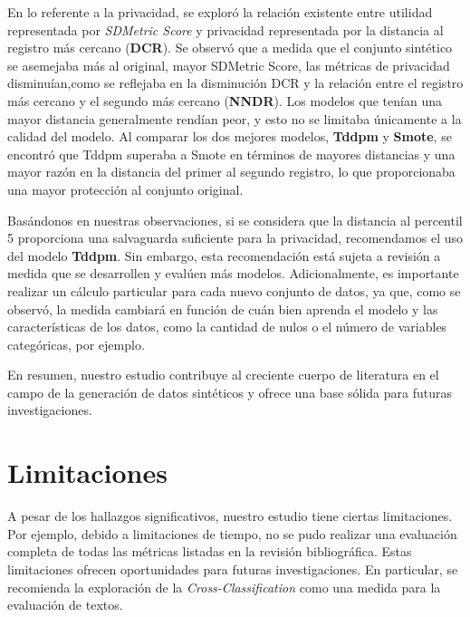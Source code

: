 En lo referente a la privacidad, se exploró la relación existente entre utilidad representada por \emph{SDMetric Score} y privacidad representada por la distancia al registro más cercano (\textbf{DCR}). Se observó que a medida que el conjunto sintético se asemejaba más al original, mayor SDMetric Score, las métricas de privacidad disminuían,como se reflejaba en la disminución DCR y la relación entre el registro más cercano y el segundo más cercano (\textbf{NNDR}). Los modelos que tenían una mayor distancia generalmente rendían peor, y esto no se limitaba únicamente a la calidad del modelo. Al comparar los dos mejores modelos, \textbf{Tddpm} y \textbf{Smote}, se encontró que Tddpm superaba a Smote en términos de mayores distancias y una mayor razón en la distancia del primer al segundo registro, lo que proporcionaba una mayor protección al conjunto original.

Basándonos en nuestras observaciones, si se considera que la distancia al percentil 5 proporciona una salvaguarda suficiente para la privacidad, recomendamos el uso del modelo \textbf{Tddpm}. Sin embargo, esta recomendación está sujeta a revisión a medida que se desarrollen y evalúen más modelos. Adicionalmente, es importante realizar un cálculo particular para cada nuevo conjunto de datos, ya que, como se observó, la medida cambiará en función de cuán bien aprenda el modelo y las características de los datos, como la cantidad de nulos o el número de variables categóricas, por ejemplo.



En resumen, nuestro estudio contribuye al creciente cuerpo de literatura en el campo de la generación de datos sintéticos y ofrece una base sólida para futuras investigaciones.


\section{Limitaciones}
\label{sec:limit}
A pesar de los hallazgos significativos, nuestro estudio tiene ciertas limitaciones. Por ejemplo, debido a limitaciones de tiempo, no se pudo realizar una evaluación completa de todas las métricas listadas en la revisión bibliográfica. Estas limitaciones ofrecen oportunidades para futuras investigaciones. En particular, se recomienda la exploración de la \emph{Cross-Classification} como una medida para la evaluación de textos.

